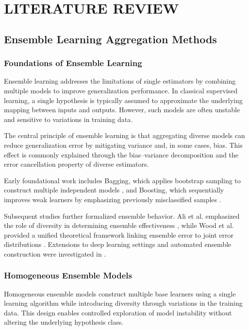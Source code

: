 \chapter{LITERATURE REVIEW}

\section{Ensemble Learning Aggregation Methods}

\subsection{Foundations of Ensemble Learning}

\hs Ensemble learning addresses the limitations of single estimators by combining multiple models to improve generalization performance. In classical supervised learning, a single hypothesis is typically assumed to approximate the underlying mapping between inputs and outputs. However, such models are often unstable and sensitive to variations in training data.

The central principle of ensemble learning is that aggregating diverse models can reduce generalization error by mitigating variance and, in some cases, bias. This effect is commonly explained through the bias--variance decomposition and the error cancellation property of diverse estimators.

Early foundational work includes Bagging, which applies bootstrap sampling to construct multiple independent models \cite{breiman1996}, and Boosting, which sequentially improves weak learners by emphasizing previously misclassified samples \cite{freund1997}.

Subsequent studies further formalized ensemble behavior. Ali et al. emphasized the role of diversity in determining ensemble effectiveness \cite{ali2015}, while Wood et al. provided a unified theoretical framework linking ensemble error to joint error distributions \cite{wood2023}. Extensions to deep learning settings and automated ensemble construction were investigated in \cite{yang2023,cagnini2023}.

\subsection{Homogeneous Ensemble Models}

\hs Homogeneous ensemble models construct multiple base learners using a single learning algorithm while introducing diversity through variations in the training data. This design enables controlled exploration of model instability without altering the underlying hypothesis class.

